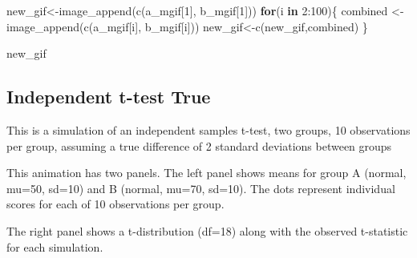 \documentclass[
  letterpaper,
  DIV=11,
  numbers=noendperiod]{scrreprt}
\newenvironment{Shaded}{\begin{snugshade}}{\end{snugshade}}
\newcommand{\ControlFlowTok}[1]{\textcolor[rgb]{0.00,0.23,0.31}{\textbf{#1}}}
\newcommand{\DecValTok}[1]{\textcolor[rgb]{0.68,0.00,0.00}{#1}}
\newcommand{\FunctionTok}[1]{\textcolor[rgb]{0.28,0.35,0.67}{#1}}
\newcommand{\NormalTok}[1]{\textcolor[rgb]{0.00,0.23,0.31}{#1}}
\newcommand{\OtherTok}[1]{\textcolor[rgb]{0.00,0.23,0.31}{#1}}
\newcommand{\SpecialCharTok}[1]{\textcolor[rgb]{0.37,0.37,0.37}{#1}}
\begin{document}
\begin{Shaded}
\begin{Highlighting}[]
\NormalTok{new\_gif}\OtherTok{\textless{}{-}}\FunctionTok{image\_append}\NormalTok{(}\FunctionTok{c}\NormalTok{(a\_mgif[}\DecValTok{1}\NormalTok{], b\_mgif[}\DecValTok{1}\NormalTok{]))}
\ControlFlowTok{for}\NormalTok{(i }\ControlFlowTok{in} \DecValTok{2}\SpecialCharTok{:}\DecValTok{100}\NormalTok{)\{}
\NormalTok{  combined }\OtherTok{\textless{}{-}} \FunctionTok{image\_append}\NormalTok{(}\FunctionTok{c}\NormalTok{(a\_mgif[i], b\_mgif[i]))}
\NormalTok{  new\_gif}\OtherTok{\textless{}{-}}\FunctionTok{c}\NormalTok{(new\_gif,combined)}
\NormalTok{\}}

\NormalTok{new\_gif}
\end{Highlighting}
\end{Shaded}

\subsection{Independent t-test True}\label{independent-t-test-true}

This is a simulation of an independent samples t-test, two groups, 10
observations per group, assuming a true difference of 2 standard
deviations between groups

This animation has two panels. The left panel shows means for group A
(normal, mu=50, sd=10) and B (normal, mu=70, sd=10). The dots represent
individual scores for each of 10 observations per group.

The right panel shows a t-distribution (df=18) along with the observed
t-statistic for each simulation.
\end{document}
